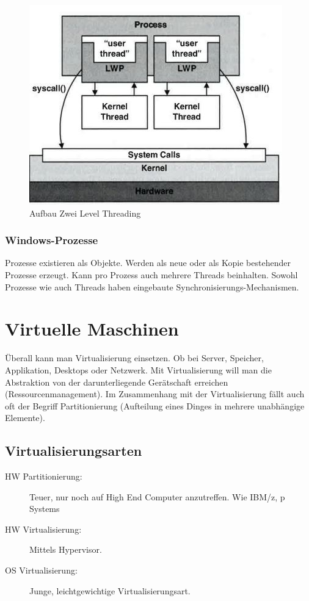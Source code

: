 \begin{figure}[h!]
	\centering
	\includegraphics[width=0.7\linewidth]{fig/system-software-aufbau-2-level-threading}
	\caption{Aufbau Zwei Level Threading}
	\label{fig:system-software-aufbau-2-level-threading}
\end{figure}

\subsubsection{Windows-Prozesse}
Prozesse existieren als Objekte. Werden als neue oder als Kopie bestehender Prozesse erzeugt. Kann pro Prozess auch mehrere Threads beinhalten. Sowohl Prozesse wie auch Threads haben eingebaute Synchronisierungs-Mechanismen.

\section{Virtuelle Maschinen}
Überall kann man Virtualisierung einsetzen. Ob bei Server, Speicher, Applikation, Desktops oder Netzwerk. Mit Virtualisierung will man die Abstraktion von der darunterliegende Gerätschaft erreichen (Ressourcenmanagement). Im Zusammenhang mit der Virtualisierung fällt auch oft der Begriff Partitionierung (Aufteilung eines Dinges in mehrere unabhängige Elemente).

\subsection{Virtualisierungsarten}
\label{sec:virtualisierungsarten}
\begin{description}
	\item[HW Partitionierung:] Teuer, nur noch auf High End Computer anzutreffen. Wie IBM/z, p Systems
	\item[HW Virtualisierung:] Mittels Hypervisor.
	\item[OS Virtualisierung:] Junge, leichtgewichtige Virtualisierungsart.
\end{description}


